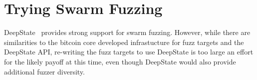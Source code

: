 \section{Trying Swarm Fuzzing}

DeepState~\cite{goodman2018deepstate} provides strong support for swarm fuzzing.  However, while there are similarities to the bitcoin core developed infrastucture for fuzz targets and the DeepState API, re-writing the fuzz targets to use DeepState is too large an effort for the likely payoff at this time, even though DeepState would also provide additional fuzzer diversity.